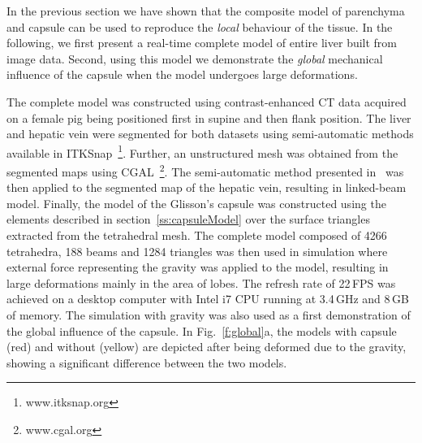 \documentclass[final,3p,times,twocolumn]{elsarticle}
\begin{document}
In the previous section we have shown that the composite model of parenchyma and 
capsule can be used to reproduce the \emph{local} behaviour of the tissue. In the following, 
we first present a real-time complete model of entire liver built from image data. 
Second, using this model we demonstrate the \emph{global} mechanical influence of the capsule when 
the model undergoes large deformations. 

The complete model was constructed using contrast-enhanced CT data acquired on a female pig 
being positioned first in supine and then flank position. 
The liver and hepatic vein were segmented for both datasets  using semi-automatic methods available in ITKSnap~\footnote{www.itksnap.org}.
Further, an unstructured mesh was obtained from the segmented maps using CGAL~\footnote{www.cgal.org}. 
The semi-automatic method presented in~\cite{Peterlik2012} was 
then applied to the segmented map of the hepatic vein, resulting in linked-beam model. 
Finally, the model of the Glisson's capsule was constructed using the elements described in 
section~\ref{ss:capsuleModel} over the surface triangles extracted from the tetrahedral mesh. 
The complete model composed of 4266 tetrahedra, 188 beams and 1284 triangles was then 
used in simulation where external force representing the gravity was applied to the model, 
resulting in large deformations mainly in the area of lobes. The refresh rate of 22\,FPS 
was achieved on a desktop computer with Intel i7 CPU running at 3.4\,GHz and 8\,GB of memory. 
The simulation with gravity was also used as a first demonstration of the global influence of the capsule. 
In Fig.~\ref{f:global}a, the models with capsule (red) and without (yellow) are depicted after being 
deformed due to the gravity, showing a significant difference between the two models.  

\end{document}
